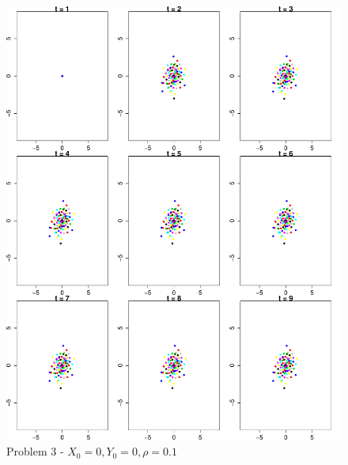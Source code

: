 \documentclass[paper=a4, fontsize=11pt]{scrartcl} %
\numberwithin{equation}{section} %
\numberwithin{figure}{section} %
\numberwithin{table}{section} %
\begin{document}
\newpage
\begin{figure}[h!]
	\centering
	\includegraphics[scale = 0.8]{3a.pdf}
	\caption{Problem 3 - $X_0 = 0, Y_0 = 0, \rho = 0.1$} 
\end{figure}
\newpage
\end{document}
